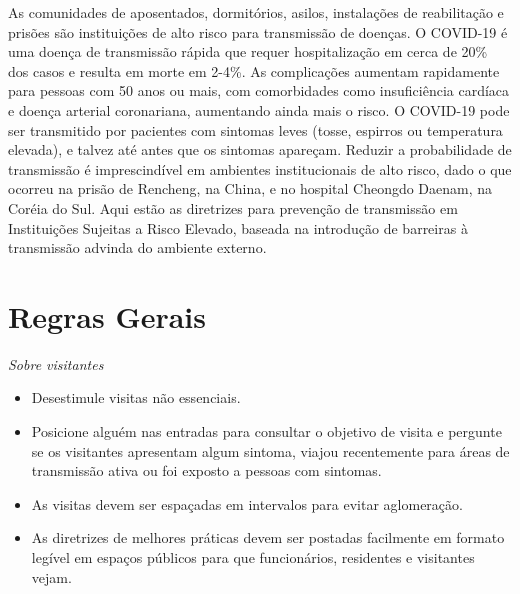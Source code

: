 \documentclass[onecolumn,journal]{IEEEtran}
\begin{document}


\begin{multicols}{2}


As comunidades de aposentados, dormitórios, asilos, instalações de reabilitação e prisões são instituições de alto risco para transmissão de doenças. O COVID-19 é uma doença de transmissão rápida que requer hospitalização em cerca de 20\% dos casos e resulta em morte em 2-4\%. As complicações aumentam rapidamente para pessoas com 50 anos ou mais, com comorbidades como insuficiência cardíaca e doença arterial coronariana, aumentando ainda mais o risco. O COVID-19 pode ser transmitido por pacientes com sintomas leves (tosse, espirros ou temperatura elevada), e talvez até antes que os sintomas apareçam. Reduzir a probabilidade de transmissão é imprescindível em ambientes institucionais de alto risco, dado o que ocorreu na prisão de Rencheng, na China, e no hospital Cheongdo Daenam, na Coréia do Sul. Aqui estão as diretrizes para prevenção de transmissão em Instituições Sujeitas a Risco Elevado, baseada na introdução de barreiras à transmissão advinda do ambiente externo.

\section*{Regras Gerais}

\textit{Sobre visitantes}

\begin{itemize}
\item Desestimule visitas não essenciais.
\item Posicione alguém nas entradas para consultar o objetivo de
visita e pergunte se os visitantes apresentam algum sintoma, viajou recentemente para áreas de transmissão ativa ou foi exposto a pessoas com sintomas.
\item As visitas devem ser espaçadas em intervalos para evitar aglomeração.
\item As diretrizes de melhores práticas devem ser postadas facilmente em formato legível em espaços públicos para que funcionários, residentes e visitantes vejam.
\end{itemize}


\end{multicols}
\end{document}
